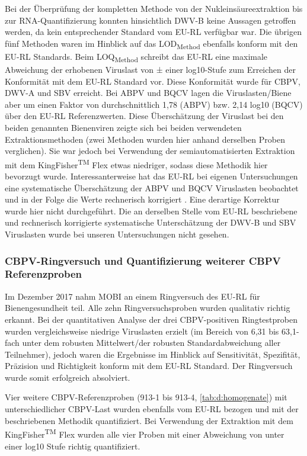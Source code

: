 Bei der Überprüfung der kompletten Methode von der Nukleinsäureextraktion bis zur RNA-Quantifizierung konnten hinsichtlich DWV-B keine Aussagen getroffen werden, da kein entsprechender Standard vom EU-RL verfügbar war. Die übrigen fünf Methoden waren im Hinblick auf das LOD\textsubscript{Method} ebenfalls konform mit den EU-RL Standards. Beim LOQ\textsubscript{Method} schreibt das EU-RL eine maximale Abweichung der erhobenen Viruslast von ± einer log10-Stufe zum Erreichen der Konformität mit dem EU-RL Standard vor. Diese Konformität wurde für CBPV, DWV-A und SBV erreicht. Bei ABPV und BQCV lagen die Viruslasten/Biene aber um einen Faktor von durchschnittlich 1,78 (ABPV) bzw. 2,14 log10 (BQCV) über den EU-RL Referenzwerten. Diese Überschätzung der Viruslast bei den beiden genannten Bienenviren zeigte sich bei beiden verwendeten Extraktionsmethoden (zwei Methoden wurden hier anhand derselben Proben verglichen). Sie war jedoch bei Verwendung der semiautomatisierten Extraktion mit dem KingFisher\textsuperscript{TM} Flex etwas niedriger, sodass diese Methodik hier bevorzugt wurde. Interessanterweise hat das EU-RL bei eigenen Untersuchungen eine systematische Überschätzung der ABPV und BQCV Viruslasten beobachtet und in der Folge die Werte rechnerisch korrigiert \citep{schurr2019}. Eine derartige Korrektur wurde hier nicht durchgeführt. Die an derselben Stelle vom EU-RL beschriebene und rechnerisch korrigierte systematische Unterschätzung der DWV-B und SBV Viruslasten wurde bei unseren Untersuchungen nicht gesehen.


\subsubsection{CBPV-Ringversuch und Quantifizierung weiterer CBPV Referenzproben} \label{chap:ringversuch_cbpv}

Im Dezember 2017 nahm MOBI an einem Ringversuch des EU-RL für Bienengesundheit teil. Alle zehn Ringversuchsproben wurden qualitativ richtig erkannt. Bei der quantitativen Analyse der drei CBPV-positiven Ringtestproben wurden vergleichsweise niedrige Viruslasten erzielt (im Bereich von 6,31 bis 63,1-fach unter dem robusten Mittelwert/der robusten Standardabweichung aller Teilnehmer), jedoch waren die Ergebnisse im Hinblick auf Sensitivität, Spezifität, Präzision und Richtigkeit konform mit dem EU-RL Standard. Der Ringversuch wurde somit erfolgreich absolviert.

Vier weitere CBPV-Referenzproben (913-1 bis 913-4, \cref{tab:d:homogenate}) mit unterschiedlicher CBPV-Last wurden ebenfalls vom EU-RL bezogen und mit der beschriebenen Methodik quantifiziert. Bei Verwendung der Extraktion mit dem KingFisher\textsuperscript{TM} Flex wurden alle vier Proben mit einer Abweichung von unter einer log10 Stufe richtig quantifiziert.


